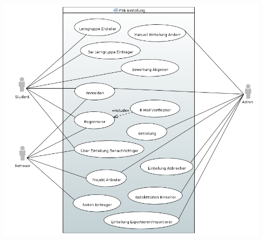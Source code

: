 \documentclass[parskip=full]{scrartcl}
\begin{document}
\includegraphics[width=\linewidth]{diagramme_pflichtenheft/UseCase_Diagram.PNG}
\end{document}
